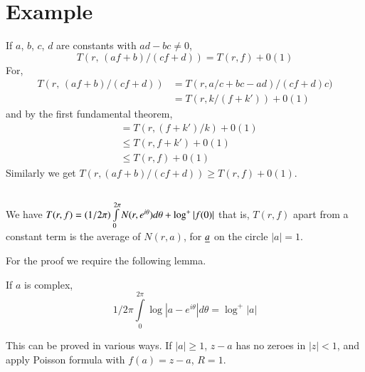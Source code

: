 \section*{Example}

If $a$, $b$, $c$, $d$ are constants with $ad-bc\neq 0$,
$$
T(r,\,(af+b)/(cf+d))=T(r,f)+0(1)
$$
For,
\begin{align*}
T(r,\, (af+b)/(cf+d)) &= T(r,a/c+bc-ad)/(cf+d)c)\\
&= T(r,k/(f+k'))+0(1)
\end{align*}
and by the first fundamental theorem,
\begin{align*}
&= T(r,(f+k')/k)+0(1)\\
&\leq T(r,f+k')+0(1)\\
&\leq T(r,f)+0(1)
\end{align*}
Similarly we get $T(r,(af+b)/(cf+d))\geq T(r,f)+0(1)$.

\subsection{}\label{part1-sec1.5}\pageoriginale 

\begin{thm}[H.\@ Cartan]\label{part1-thm3}
We have
$T(r,f)=(1/2\pi)\int\limits^{2\pi}_{0}N(r,e^{i\theta})d\theta+\unskip\break\log^{+}|f(0)|$
that is, $T(r,f)$ apart from a constant term is the average of
$N(r,a)$, for $\underline{a}$ on the circle $|a|=1$.
\end{thm}

For the proof we require the following lemma.
\begin{lem}\label{part1-lem1}
If $a$ is complex,
$$
1/2\pi \int\limits^{2\pi}_{0}\log|a-e^{i\theta}|d\theta=\log^{+}|a|
$$
\end{lem}

This can be proved in various ways. If $|a|\geq 1$, $z-a$ has no
zeroes in $|z|<1$, and apply Poisson formula with $f(a)=z-a$, $R=1$.


